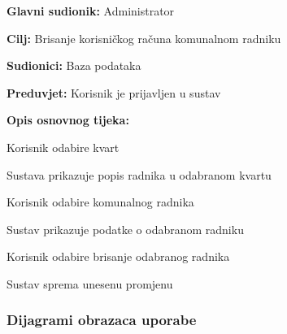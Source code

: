 				
				
				
			
				
				\noindent {}
					\begin{packed_item}
	
						\item \textbf{Glavni sudionik: }Administrator
						\item  \textbf{Cilj:} Brisanje korisničkog računa komunalnom radniku
						\item  \textbf{Sudionici:} Baza podataka
						\item  \textbf{Preduvjet:} Korisnik je prijavljen u sustav
						\item  \textbf{Opis osnovnog tijeka:}
						
						\item[] \begin{packed_enum}
	
							\item Korisnik odabire kvart
							\item Sustava prikazuje popis radnika u odabranom kvartu
							\item Korisnik odabire komunalnog radnika
							\item Sustav prikazuje podatke o odabranom radniku
							\item Korisnik odabire brisanje odabranog radnika
							\item Sustav sprema unesenu promjenu
						\end{packed_enum}
						
											\end{packed_item}
				
				
				
				
				
				
					
				\subsubsection{Dijagrami obrazaca uporabe}
					
					
					
